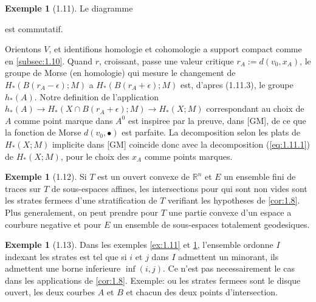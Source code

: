 \documentclass[11pt,a4paper]{article}
\theoremstyle{plain}
\theoremstyle{definition}
\newtheorem{example}[theorem]{Exemple}
\begin{document}
\begin{example}[1.11]
Le diagramme
est commutatif.

Orientons $V$, et identifions homologie et cohomologie a support compact comme en \ref{subsec:1.10}. Quand $r$, croissant, passe une valeur critique $r_A := d(v_0,x_A)$, le groupe de Morse (en homologie) qui mesure le changement de $H_*(B(r_A-\epsilon);M)$ a $H_*(B(r_A+\epsilon);M)$ est, d'apres (1.11.3), le groupe $h_*(A)$. Notre definition de l'application $h_*(A) \to H_*(X \cap B(r_A+\epsilon);M) \to H_*(X;M)$ correspondant au choix de $A$ comme point marque dans $A^0$ est inspiree par la preuve, dans [GM], de ce que la fonction de Morse $d(v_0,\bullet)$ est parfaite. La decomposition selon les plats de $H_*(X;M)$ implicite dans [GM] coincide donc avec la decomposition (\ref{eq:1.11.1}) de $H_*(X;M)$, pour le choix des $x_A$ comme points marques.
\end{example}

\begin{example}[1.12]\label{ex:1.12}
Si $T$ est un ouvert convexe de $\mathbb{R}^n$ et $E$ un ensemble fini de traces sur $T$ de sous-espaces affines, les intersections pour qui sont non vides sont les strates fermees d'une stratification de $T$ verifiant les hypotheses de \ref{cor:1.8}. Plus generalement, on peut prendre pour $T$ une partie convexe d'un espace a courbure negative et pour $E$ un ensemble de sous-espaces totalement geodesiques.
\end{example}

\begin{example}[1.13]\label{ex:1.13}
Dans les exemples \ref{ex:1.11} et \ref{ex:1.12}, l'ensemble ordonne $I$ indexant les strates est tel que si $i$ et $j$ dans $I$ admettent un minorant, ils admettent une borne inferieure $\inf(i,j)$. Ce n'est pas necessairement le cas dans les applications de \ref{cor:1.8}. Exemple: ou les strates fermees sont le disque ouvert, les deux courbes $A$ et $B$ et chacun des deux points d'intersection.
\end{example}
\end{document}
